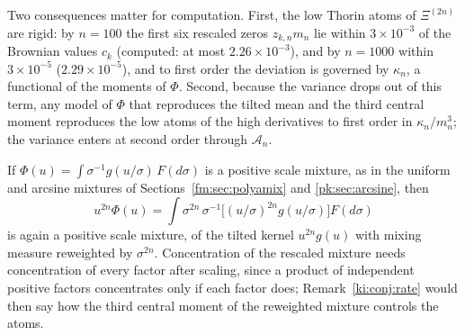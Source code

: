 Two consequences matter for computation. First, the low Thorin atoms of $\Xi^{(2n)}$ are rigid: by $n=100$ the first six rescaled zeros $z_{k,n}m_n$ lie within $3\times10^{-3}$ of the Brownian values $c_k$ (computed: at most $2.26\times10^{-3}$), and by $n=1000$ within $3\times10^{-5}$ ($2.29\times10^{-5}$), and to first order the deviation is governed by $\kappa_n$, a functional of the moments of $\Phi$. Second, because the variance drops out of this term, any model of $\Phi$ that reproduces the tilted mean and the third central moment reproduces the low atoms of the high derivatives to first order in $\kappa_n/m_n^3$; the variance enters at second order through $\mathcal A_n$.

\begin{remark}\label{ki:rem:mixture}
If $\Phi(u)=\int\sigma^{-1}g(u/\sigma)\,F(d\sigma)$ is a positive scale mixture, as in the uniform and arcsine mixtures of Sections~\ref{fm:sec:polyamix} and \ref{pk:sec:arcsine}, then
\[
u^{2n}\Phi(u)=\int\sigma^{2n}\,\sigma^{-1}\bigl[(u/\sigma)^{2n}g(u/\sigma)\bigr]F(d\sigma)
\]
is again a positive scale mixture, of the tilted kernel $u^{2n}g(u)$ with mixing measure reweighted by $\sigma^{2n}$. Concentration of the rescaled mixture needs concentration of every factor after scaling, since a product of independent positive factors concentrates only if each factor does; Remark~\ref{ki:conj:rate} would then say how the third central moment of the reweighted mixture controls the atoms.
\end{remark}
